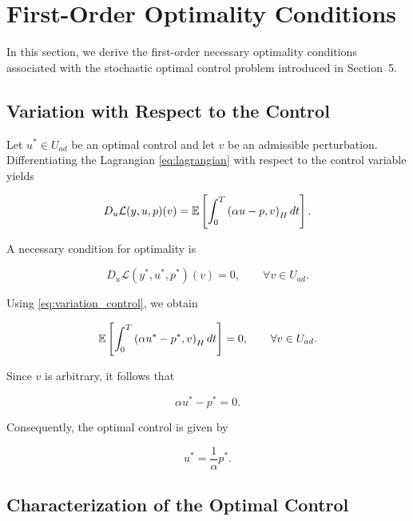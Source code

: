\section{First-Order Optimality Conditions}

In this section, we derive the first-order necessary optimality conditions associated with the 
stochastic optimal control problem introduced in Section~5.

\subsection{Variation with Respect to the Control}

Let \(u^\ast\in U_{ad}\) be an optimal control and let \(v\) be an admissible perturbation. 
Differentiating the Lagrangian \eqref{eq:lagrangian} with respect to the control variable yields

\begin{equation}
D_u \mathcal L(y,u,p)(v)
=
\mathbb{E}
\left[
\int_0^T
\left(
\alpha u - p,
v
\right)_H
dt
\right].
\label{eq:variation_control}
\end{equation}

A necessary condition for optimality is

\[
D_u \mathcal L(y^\ast,u^\ast,p^\ast)(v)=0,
\qquad
\forall v\in U_{ad}.
\]

Using \eqref{eq:variation_control}, we obtain

\begin{equation}
\mathbb{E}
\left[
\int_0^T
\left(
\alpha u^\ast-p^\ast,
v
\right)_H
dt
\right]
=
0,
\qquad
\forall v\in U_{ad}.
\label{eq:optimality_variational}
\end{equation}

Since \(v\) is arbitrary, it follows that

\begin{equation}
\alpha u^\ast-p^\ast=0.
\label{eq:control_relation}
\end{equation}

Consequently, the optimal control is given by

\begin{equation}
u^\ast
=
\frac{1}{\alpha}
p^\ast.
\label{eq:optimal_control}
\end{equation}

\subsection{Characterization of the Optimal Control}

